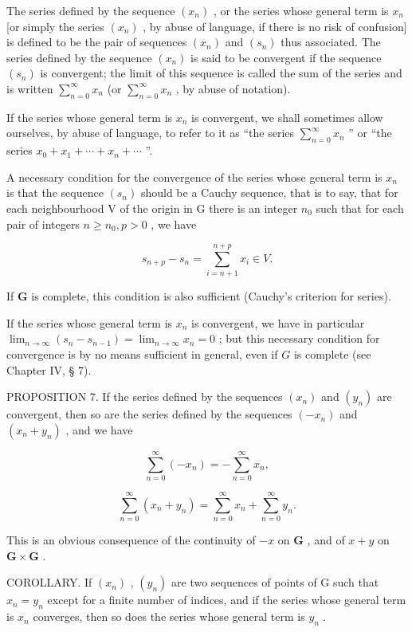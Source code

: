 The series defined by the sequence \((x_{n})\) , or the series whose general term is \(x_{n}\) {[}or simply the series \((x_{n})\) , by abuse of language, if there is no risk of confusion{]} is defined to be the pair of sequences \((x_{n})\) and \((s_{n})\) thus associated. The series defined by the sequence \((x_{n})\) is said to be convergent if the sequence \((s_n)\) is convergent; the limit of this sequence is called the sum of the series and is written \(\sum_{n=0}^{\infty} x_n\) (or \(\sum_{n=0}^{\infty} x_n\) , by abuse of notation).

If the series whose general term is \(x_{n}\) is convergent, we shall sometimes allow ourselves, by abuse of language, to refer to it as ``the series \(\sum_{n=0}^{\infty} x_{n}\) '' or ``the series \(x_{0} + x_{1} + \cdots + x_{n} + \cdots\) ''.

A necessary condition for the convergence of the series whose general term is \(x_{n}\) is that the sequence \((s_{n})\) should be a Cauchy sequence, that is to say, that for each neighbourhood V of the origin in G there is an integer \(n_{0}\) such that for each pair of integers \(n \geqslant n_{0}, p > 0\) , we have

\[
s _ {n + p} - s _ {n} = \sum_ {i = n + 1} ^ {n + p} x _ {i} \in V.
\]

If \(\mathbf{G}\) is complete, this condition is also sufficient (Cauchy's criterion for series).

If the series whose general term is \(x_{n}\) is convergent, we have in particular \(\lim_{n\to \infty}(s_n - s_{n-1}) = \lim_{n\to \infty}x_n = 0\) ; but this necessary condition for convergence is by no means sufficient in general, even if \(G\) is complete (see Chapter IV, § 7).

PROPOSITION 7. If the series defined by the sequences \((x_{n})\) and \((y_{n})\) are convergent, then so are the series defined by the sequences \((-x_{n})\) and \((x_{n} + y_{n})\) , and we have

\[
\sum_ {n = 0} ^ {\infty} (- x _ {n}) = - \sum_ {n = 0} ^ {\infty} x _ {n},\tag{7}
\]

\[
\sum_ {n = 0} ^ {\infty} \left(x _ {n} + y _ {n}\right) = \sum_ {n = 0} ^ {\infty} x _ {n} + \sum_ {n = 0} ^ {\infty} y _ {n}.\tag{8}
\]

This is an obvious consequence of the continuity of \(-x\) on \(\mathbf{G}\) , and of \(x + y\) on \(\mathbf{G} \times \mathbf{G}\) .

COROLLARY. If \((x_{n})\) , \((y_{n})\) are two sequences of points of G such that \(x_{n}=y_{n}\) except for a finite number of indices, and if the series whose general term is \(x_{n}\) converges, then so does the series whose general term is \(y_{n}\) .

